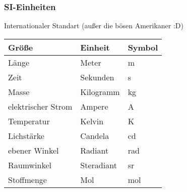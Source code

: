 \documentclass[11pt]{article}
\begin{document}
\subsubsection{SI-Einheiten}
\label{sec-1-3-2}
Internationaler Standart (außer die bösen Amerikaner :D)

\begin{center}
\begin{tabular}{lll}
Größe & Einheit & Symbol\\
\hline
Länge & Meter & \si{\meter}\\
Zeit & Sekunden & \si{\second}\\
Masse & Kilogramm & \si{\kilogram}\\
elektrischer Strom & Ampere & \si{\ampere}\\
Temperatur & Kelvin & \si{\kelvin}\\
Lichstärke & Candela & \si{\candela}\\
ebener Winkel & Radiant & \si{\radian}\\
Raumwinkel & Steradiant & \si{\steradian}\\
Stoffmenge & Mol & \si{\mol}\\
\end{tabular}
\end{center}
\end{document}
